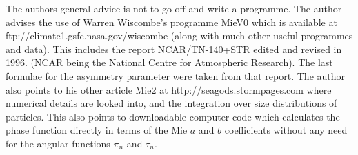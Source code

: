 The authors general advice is not to go off and write a programme. The author 
advises the use of Warren Wiscombe's programme MieV0 
which is  available at
\newline
 ftp://climate1.gsfc.nasa.gov/wiscombe  
(along with much other useful programmes and data). 
This includes the report NCAR/TN-140+STR
edited and revised in 1996. (NCAR being the National Centre for Atmospheric Research). 
The last formulae for the asymmetry parameter were taken from that report.
The author also points to his other article Mie2 at
 http://seagods.stormpages.com 
where numerical details are looked into, and the integration over size distributions of particles.
This also points to downloadable computer code which calculates the phase function 
directly in terms of the Mie $a$ and $b$ coefficients without any need for the angular functions
$\pi_n$ and $\tau_n$.




